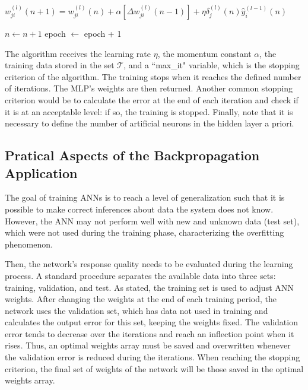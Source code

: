 \begin{algorithm}[h!]
\begin{algorithmic}[1]
                        \STATE $w_{ji}^{(l)} (n+1) = w_{ji}^{(l)}(n) + \alpha[\Delta w_{ji}^{(l)}(n-1)] + \eta \delta_j^{(l)}(n) \hat{y}_i^{(l-1)} (n)$ 
                    \ENDFOR
                \ENDFOR

            \ENDFOR

            \STATE $n \leftarrow n + 1 $
		\ENDFOR
            \STATE epoch $\leftarrow$ epoch + 1
        \ENDWHILE
    \end{algorithmic}
\end{algorithm}


The algorithm receives the learning rate $\eta$, the momentum constant $\alpha$, the training data stored in the set $\mathcal{T}$, and a ``max\_it" variable, which is the stopping criterion of the algorithm. The training stops when it reaches the defined number of iterations. The MLP's weights are then returned. Another common stopping criterion would be to calculate the error at the end of each iteration and check if it is at an acceptable level: if so, the training is stopped. Finally, note that it is necessary to define the number of artificial neurons in the hidden layer a priori.

\subsection{Pratical Aspects of the Backpropagation Application}
\label{ssec:Pratical}

The goal of training ANNs is to reach a level of generalization such that it is possible to make correct inferences about data the system does not know. However, the ANN may not perform well with new and unknown data (test set), which were not used during the training phase, characterizing the overfitting phenomenon.

Then, the network's response quality needs to be evaluated during the learning process. A standard procedure separates the available data into three sets: training, validation, and test. As stated, the training set is used to adjust ANN weights. After changing the weights at the end of each training period, the network uses the validation set, which has data not used in training and calculates the output error for this set, keeping the weights fixed. The validation error tends to decrease over the iterations and reach an inflection point when it rises. Thus, an optimal weights array must be saved and overwritten whenever the validation error is reduced during the iterations. When reaching the stopping criterion, the final set of weights of the network will be those saved in the optimal weights array.


